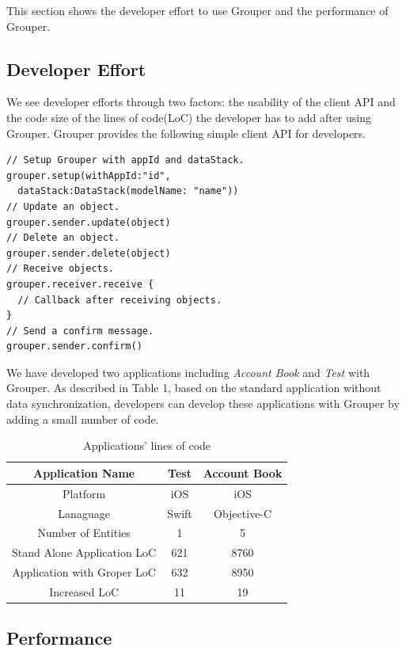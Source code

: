 \documentclass[twocolumn,10pt]{article}
\begin{document}
This section shows the developer effort to use Grouper and the performance of Grouper.

\subsection{Developer Effort}

We see developer efforts through two factors: the usability of the client API and　the code size of the lines of code(LoC) the developer has to add after using Grouper. 
Grouper provides the following simple client API for developers.

\begin{lstlisting}
// Setup Grouper with appId and dataStack.
grouper.setup(withAppId:"id",
  dataStack:DataStack(modelName: "name"))
// Update an object.
grouper.sender.update(object)
// Delete an object.
grouper.sender.delete(object)
// Receive objects.
grouper.receiver.receive { 
  // Callback after receiving objects.
}
// Send a confirm message.
grouper.sender.confirm()
\end{lstlisting}

We have developed two applications including \emph{Account Book} and \emph{Test} with Grouper. 
As described in Table 1, based on the standard application without data synchronization, developers can develop these applications with Grouper by adding a small number of code. 

\begin{table}[!htb]
	\footnotesize
	\centering  
	\caption{Applications' lines of code}
	\begin{tabular}{c|c|c}
		\hline
		Application Name           & Test  & Account Book \\ \hline
		Platform            & iOS   & iOS          \\ \hline
		Lanaguage           & Swift & Objective-C  \\ \hline
		Number of Entities  & 1     & 5            \\ \hline
		Stand Alone Application LoC     & 621   & 8760         \\ \hline
		Application with Groper LoC     & 632   & 8950         \\ \hline
		Increased LoC & 11    & 19           \\ \hline
	\end{tabular}
\end{table}

\subsection{Performance}
\end{document}

